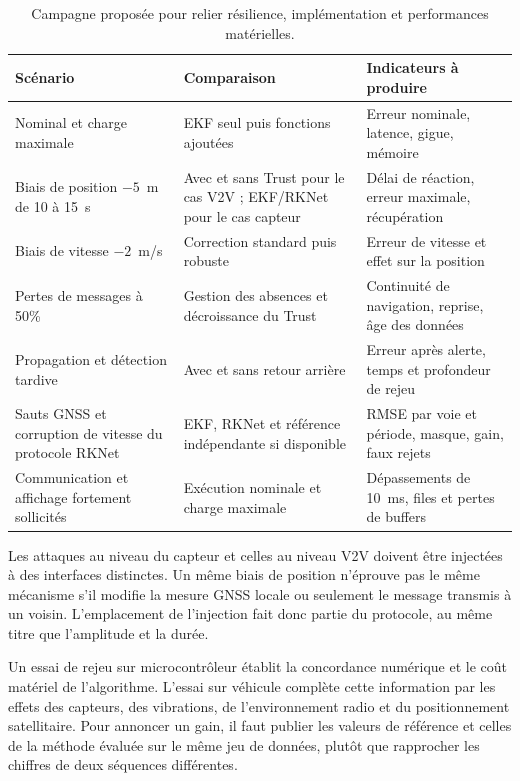 \begin{table}[!htbp]\centering\small
\begin{tabularx}{\linewidth}{|L{4.0cm}|L{4.6cm}|Y|}\hline
{}\textbf{Scénario} & \textbf{Comparaison} & \textbf{Indicateurs à produire}\\\hline
Nominal et charge maximale & EKF seul puis fonctions ajoutées & Erreur nominale, latence, gigue, mémoire\\\hline
Biais de position $-5$~m de 10 à 15~s & Avec et sans Trust pour le cas V2V ; EKF/RKNet pour le cas capteur & Délai de réaction, erreur maximale, récupération\\\hline
Biais de vitesse $-2$~m/s & Correction standard puis robuste & Erreur de vitesse et effet sur la position\\\hline
Pertes de messages à 50\% & Gestion des absences et décroissance du Trust & Continuité de navigation, reprise, âge des données\\\hline
Propagation et détection tardive & Avec et sans retour arrière & Erreur après alerte, temps et profondeur de rejeu\\\hline
Sauts GNSS et corruption de vitesse du protocole RKNet & EKF, RKNet et référence indépendante si disponible & RMSE par voie et période, masque, gain, faux rejets\\\hline
Communication et affichage fortement sollicités & Exécution nominale et charge maximale & Dépassements de 10~ms, files et pertes de buffers\\\hline
\end{tabularx}
\caption{Campagne proposée pour relier résilience, implémentation et performances matérielles.}
\end{table}

Les attaques au niveau du capteur et celles au niveau V2V doivent être injectées à des interfaces distinctes. Un même biais de position n'éprouve pas le même mécanisme s'il modifie la mesure GNSS locale ou seulement le message transmis à un voisin. L'emplacement de l'injection fait donc partie du protocole, au même titre que l'amplitude et la durée.

Un essai de rejeu sur microcontrôleur établit la concordance numérique et le coût matériel de l'algorithme. L'essai sur véhicule complète cette information par les effets des capteurs, des vibrations, de l'environnement radio et du positionnement satellitaire. Pour annoncer un gain, il faut publier les valeurs de référence et celles de la méthode évaluée sur le même jeu de données, plutôt que rapprocher les chiffres de deux séquences différentes.
\FloatBarrier

